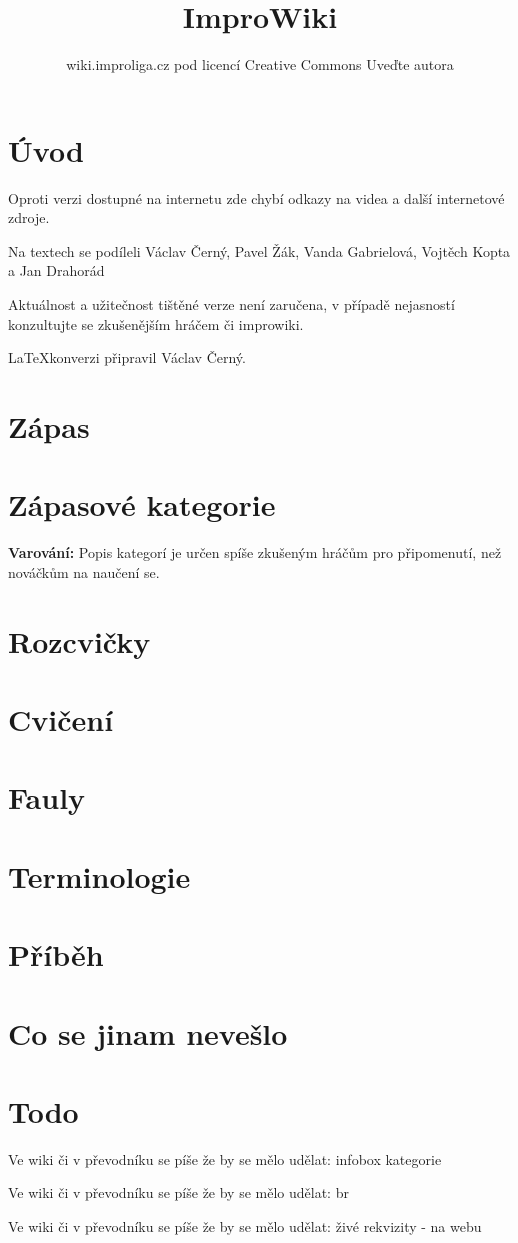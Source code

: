 \documentclass[a4paper,10pt]{book}
\title{ImproWiki}
\author{wiki.improliga.cz pod licencí Creative Commons Uveďte autora}
\newcommand{\todo}[1]{
Ve wiki či v převodníku se píše že by se mělo udělat: #1 
}
\begin{document}
\begin{titlepage}
\maketitle
\end{titlepage}
 
\chapter{Úvod}\label{úvod}


Oproti verzi dostupné na internetu zde chybí odkazy na videa a další internetové zdroje.

Na textech se podíleli Václav Černý, Pavel Žák, Vanda Gabrielová, Vojtěch Kopta a Jan Drahorád

Aktuálnost a užitečnost tištěné verze není zaručena, v případě nejasností konzultujte se zkušenějším hráčem či improwiki.


\LaTeX konverzi připravil  Václav Černý. 
\chapter{Zápas}



\chapter{Zápasové kategorie}\label{zápasové kategorie}
\textbf{Varování:} Popis kategorí je určen spíše zkušeným hráčům pro připomenutí, než nováčkům na naučení se.  


\chapter{Rozcvičky}\label{rozcvičky}


\chapter{Cvičení}\label{cvičení}


\chapter{Fauly}\label{fauly}


\chapter{Terminologie}\label{terminologie}



\chapter{Příběh}\label{pribeh}


\chapter{Co se jinam nevešlo}\label{co se jinam nevešlo}

\chapter{Todo}
\todo{infobox kategorie}

\todo{br}

\todo{živé rekvizity - na webu}

\setcounter{tocdepth}{1}
\tableofcontents
\end{document}
